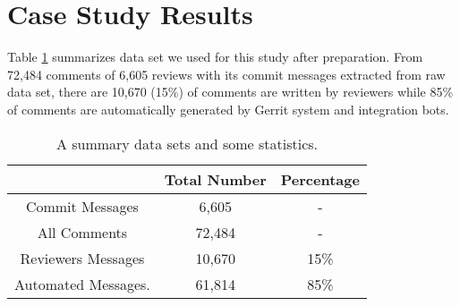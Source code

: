 
\section{Case Study Results}
Table \ref{tb:datastatistic} summarizes data set we used for this study after preparation.
From 72,484 comments of 6,605 reviews with its commit messages extracted from raw data set, there are 10,670 (15\%) of comments are written by reviewers while 85\% of comments are automatically generated by Gerrit system and integration bots.  

\begin{table}[!h]
\caption{A summary data sets and some statistics.}
\centering
\small
\begin{tabular}{ccc}
\hline
& Total Number & Percentage \\ \hline \hline
Commit Messages & 6,605 &  -  \\ \hline
All Comments & 72,484& - \\ \hline
Reviewers Messages & 10,670 & 15\% \\ \hline
Automated Messages. & 61,814 & 85\% \\ \hline 

\end{tabular}
\label{tb:datastatistic}
\end{table}



